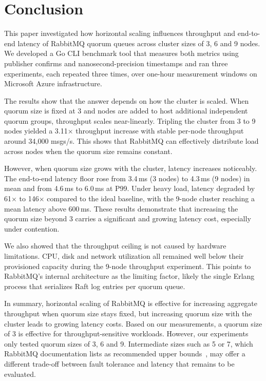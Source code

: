 \section{Conclusion}

This paper investigated how horizontal scaling influences throughput and end-to-end latency of RabbitMQ quorum queues across cluster sizes of 3, 6 and 9 nodes. We developed a Go CLI benchmark tool that measures both metrics using publisher confirms and nanosecond-precision timestamps and ran three experiments, each repeated three times, over one-hour measurement windows on Microsoft Azure infrastructure.

The results show that the answer depends on how the cluster is scaled. When quorum size is fixed at 3 and nodes are added to host additional independent quorum groups, throughput scales near-linearly. Tripling the cluster from 3 to 9 nodes yielded a 3.11$\times$ throughput increase with stable per-node throughput around 34{,}000 msgs/s. This shows that RabbitMQ can effectively distribute load across nodes when the quorum size remains constant.

However, when quorum size grows with the cluster, latency increases noticeably. The end-to-end latency floor rose from 3.4\,ms (3 nodes) to 4.3\,ms (9 nodes) in mean and from 4.6\,ms to 6.0\,ms at P99. Under heavy load, latency degraded by 61$\times$ to 146$\times$ compared to the ideal baseline, with the 9-node cluster reaching a mean latency above 600\,ms. These results demonstrate that increasing the quorum size beyond 3 carries a significant and growing latency cost, especially under contention.

We also showed that the throughput ceiling is not caused by hardware limitations. CPU, disk and network utilization all remained well below their provisioned capacity during the 9-node throughput experiment. This points to RabbitMQ's internal architecture as the limiting factor, likely the single Erlang process that serializes Raft log entries per quorum queue.

In summary, horizontal scaling of RabbitMQ is effective for increasing aggregate throughput when quorum size stays fixed, but increasing quorum size with the cluster leads to growing latency costs. Based on our measurements, a quorum size of 3 is effective for throughput-sensitive workloads. However, our experiments only tested quorum sizes of 3, 6 and 9. Intermediate sizes such as 5 or 7, which RabbitMQ documentation lists as recommended upper bounds~\cite{rmq_quorum_docs}, may offer a different trade-off between fault tolerance and latency that remains to be evaluated.
